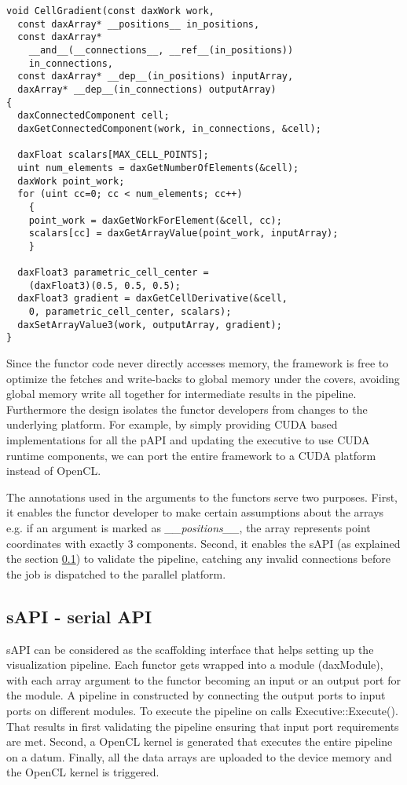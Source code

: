 \documentclass{vgtc}                          %
\begin{document}
\small{
\begin{verbatim}
void CellGradient(const daxWork work,
  const daxArray* __positions__ in_positions,
  const daxArray*
    __and__(__connections__, __ref__(in_positions))
    in_connections,
  const daxArray* __dep__(in_positions) inputArray,
  daxArray* __dep__(in_connections) outputArray)
{
  daxConnectedComponent cell;
  daxGetConnectedComponent(work, in_connections, &cell);

  daxFloat scalars[MAX_CELL_POINTS];
  uint num_elements = daxGetNumberOfElements(&cell);
  daxWork point_work;
  for (uint cc=0; cc < num_elements; cc++)
    {
    point_work = daxGetWorkForElement(&cell, cc);
    scalars[cc] = daxGetArrayValue(point_work, inputArray);
    }

  daxFloat3 parametric_cell_center =
    (daxFloat3)(0.5, 0.5, 0.5);
  daxFloat3 gradient = daxGetCellDerivative(&cell,
    0, parametric_cell_center, scalars);
  daxSetArrayValue3(work, outputArray, gradient);
}
\end{verbatim}
}

Since the functor code never directly accesses memory, the framework is free to
optimize the fetches and write-backs to global memory under the covers, avoiding
global memory write all together for intermediate results in the pipeline.
Furthermore the design isolates the functor developers from changes to the
underlying platform. For example, by simply providing CUDA based implementations
for all the pAPI and updating the executive to use CUDA runtime components, we
can port the entire framework to a CUDA platform instead of OpenCL.

The annotations used in the arguments to the functors serve two purposes.
First, it enables the functor developer to make certain assumptions about
the arrays e.g. if an argument is marked as \emph{\_\_positions\_\_}, the
array represents point coordinates with exactly 3 components.
Second, it enables the sAPI (as explained the section \ref{sec:sAPI}) to validate
the pipeline, catching any invalid connections before the job is dispatched to
the parallel platform.

\subsection{sAPI - serial API}
\label{sec:sAPI}

sAPI can be considered as the scaffolding interface that helps setting up the
visualization pipeline. Each functor gets wrapped into a module (daxModule),
with each array argument to the functor  becoming an input or an output port for
the module. A pipeline in constructed by connecting the output ports to input
ports on different modules. To execute the pipeline on calls
Executive::Execute(). That results in first validating the pipeline ensuring
that input port requirements are met. Second, a OpenCL kernel is generated that
executes the entire pipeline on a datum. Finally, all the data arrays are
uploaded to the device memory and the OpenCL kernel is triggered.
\end{document}
